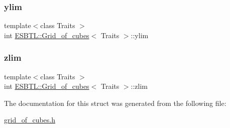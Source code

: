 \subsubsection{\texorpdfstring{ylim}{ylim}}
{\footnotesize\ttfamily template$<$class Traits $>$ \\
int \hyperlink{structESBTL_1_1Grid__of__cubes}{E\+S\+B\+T\+L\+::\+Grid\+\_\+of\+\_\+cubes}$<$ Traits $>$\+::ylim}

\mbox{\label{structESBTL_1_1Grid__of__cubes_afd4aa09e23df27cc617a6939f8a1fcd6}} 
\subsubsection{\texorpdfstring{zlim}{zlim}}
{\footnotesize\ttfamily template$<$class Traits $>$ \\
int \hyperlink{structESBTL_1_1Grid__of__cubes}{E\+S\+B\+T\+L\+::\+Grid\+\_\+of\+\_\+cubes}$<$ Traits $>$\+::zlim}



The documentation for this struct was generated from the following file\+:\begin{DoxyCompactItemize}
\item 
\hyperlink{grid__of__cubes_8h}{grid\+\_\+of\+\_\+cubes.\+h}\end{DoxyCompactItemize}
